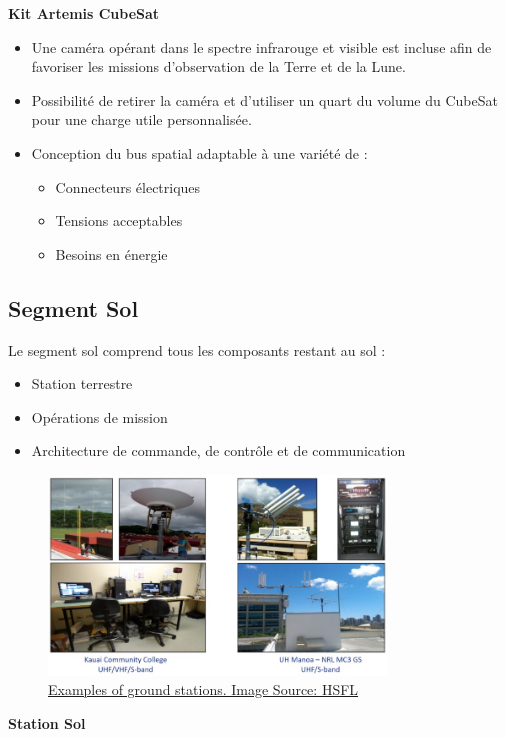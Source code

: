 \textbf{Kit Artemis CubeSat}
\begin{itemize}
    \item Une caméra opérant dans le spectre infrarouge et visible est incluse afin de favoriser les missions d'observation de la Terre et de la Lune.  
    \item Possibilité de retirer la caméra et d'utiliser un quart du volume du CubeSat pour une charge utile personnalisée.  
    \item Conception du bus spatial adaptable à une variété de :
    \begin{itemize}
        \item Connecteurs électriques  
        \item Tensions acceptables  
        \item Besoins en énergie  
    \end{itemize}
\end{itemize}
\subsection{Segment Sol}
Le segment sol comprend tous les composants restant au sol :  
\begin{itemize}  
    \item Station terrestre  
    \item Opérations de mission  
    \item Architecture de commande, de contrôle et de communication  
\end{itemize}
\begin{figure}[H] %
    \centering
    \includegraphics[width=0.8\textwidth]{figures/3.7.jpg}
    \caption{\href{https://www.hsfl.hawaii.edu/ground-stations/}{Examples of ground stations. Image Source: HSFL}}
    \label{fig:communication2}
\end{figure}
\textbf{Station Sol}

